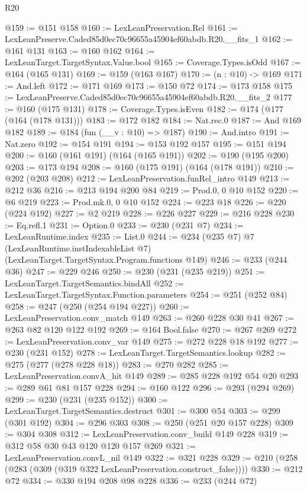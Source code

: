 \begin{lexlean}{R20}
\begin{coremodule}
@159 := @151 @158
@160 := LexLeanPreservation.Rel
@161 := LexLeanPreserve.Caded85d0ec70c96655a45904ef60abdb.R20.__fits_1
@162 := @161 @131
@163 := @160 @162
@164 := LexLeanTarget.TargetSyntax.Value.bool
@165 := Coverage.Types.isOdd
@167 := @164 (@165 @131)
@169 := @159 (@163 @167)
@170 := (n : @10) -> @169
@171 := And.left
@172 := @171 @169
@173 := @150 @72
@174 := @173 @158
@175 := LexLeanPreserve.Caded85d0ec70c96655a45904ef60abdb.R20.__fits_2
@177 := @160 (@175 @131)
@178 := Coverage.Types.isEven
@182 := @174 (@177 (@164 (@178 @131)))
@183 := @172 @182
@184 := Nat.rec.{0}
@187 := And @169 @182
@189 := @184 (fun (__v : @10) => @187)
@190 := And.intro
@191 := Nat.zero
@192 := @154 @191
@194 := @153 @192 @157
@195 := @151 @194
@200 := @160 (@161 @191) (@164 (@165 @191))
@202 := @190 (@195 @200)
@203 := @173 @194
@208 := @160 (@175 @191) (@164 (@178 @191))
@210 := @202 (@203 @208)
@212 := LexLeanPreservation.funRel_intro @149
@213 := @212 @36
@216 := @213 @194 @200 @84
@219 := Prod.{0, 0} @10 @152
@220 := @6 @219
@223 := Prod.mk.{0, 0} @10 @152
@224 := @223 @18
@226 := @220 (@224 @192)
@227 := @2 @219
@228 := @226 @227
@229 := @216 @228
@230 := Eq.refl.{1}
@231 := Option.{0}
@233 := @230 (@231 @7)
@234 := LexLeanRuntime.index
@235 := List.{0}
@244 := @234
    (@235 @7)
    @7
    (LexLeanRuntime.instIndexableList @7)
    (LexLeanTarget.TargetSyntax.Program.functions @149)
@246 := @233 (@244 @36)
@247 := @229 @246
@250 := @230 (@231 (@235 @219))
@251 := LexLeanTarget.TargetSemantics.bindAll
@252 := LexLeanTarget.TargetSyntax.Function.parameters
@254 := @251 (@252 @84)
@258 := @247 (@250 (@254 @194 @227))
@260 := LexLeanPreservation.conv_match @149
@263 := @260 @228 @30 @41
@267 := @263 @82 @120 @122 @192
@269 := @164 Bool.false
@270 := @267 @269
@272 := LexLeanPreservation.conv_var @149
@275 := @272 @228 @18 @192
@277 := @230 (@231 @152)
@278 := LexLeanTarget.TargetSemantics.lookup
@282 := @275 (@277 (@278 @228 @18))
@283 := @270 @282
@285 := LexLeanPreservation.convA_hit @149
@289 := @285 @228 @192 @54 @20
@293 := @289 @61 @81 @157 @228
@294 := @160 @122
@296 := @293 (@294 @269)
@299 := @230 (@231 (@235 @152))
@300 := LexLeanTarget.TargetSemantics.destruct
@301 := @300 @54
@303 := @299 (@301 @192)
@304 := @296 @303
@308 := @250 (@251 @20 @157 @228)
@309 := @304 @308
@312 := LexLeanPreservation.conv_build @149 @228
@319 := @312 @58 @30 @43 @120 @120 @157 @269
@321 := LexLeanPreservation.convL_nil @149
@322 := @321 @228
@329 := @210 (@258 (@283 (@309 (@319 @322 LexLeanPreservation.construct_false))))
@330 := @212 @72
@334 := @330 @194 @208 @98 @228
@336 := @233 (@244 @72)

\end{coremodule}
\end{lexlean}
